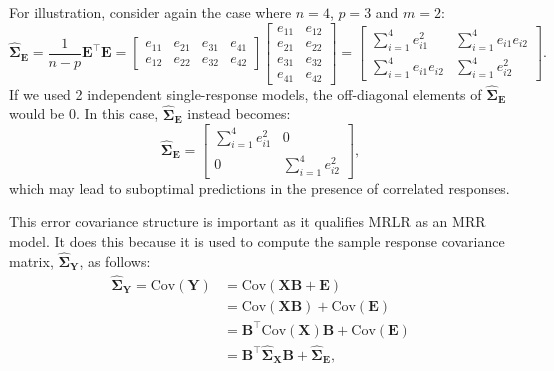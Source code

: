\documentclass[11pt]{report} %
\begin{document}
For illustration, consider again the case where $n=4$, $p=3$ and $m=2$:
\begin{equation}
    \mathbf{\hat{\Sigma}_E} = \frac{1}{n-p}\mathbf{E}^\top \mathbf{E}=
\begin{bmatrix}
e_{11} & e_{21} & e_{31} & e_{41} \\
e_{12} & e_{22} & e_{32} & e_{42}
\end{bmatrix}
\begin{bmatrix}
e_{11} & e_{12} \\
e_{21} & e_{22} \\
e_{31} & e_{32} \\
e_{41} & e_{42}
\end{bmatrix}=
\begin{bmatrix}
\sum_{i=1}^{4} e_{i1}^2 & \sum_{i=1}^{4} e_{i1} e_{i2} \\
\sum_{i=1}^{4} e_{i1} e_{i2} & \sum_{i=1}^{4} e_{i2}^2
\end{bmatrix}.
\label{off-diag}
\end{equation}
If we used 2 independent single-response models, the off-diagonal elements of \( \mathbf{\hat{\Sigma}_E} \) would be 0. In this case, $\mathbf{\hat{\Sigma}_E}$ instead becomes:
\begin{equation}
    \mathbf{\hat{\Sigma}_E} =
\begin{bmatrix}
\sum_{i=1}^{4} e_{i1}^2 & 0 \\
0 & \sum_{i=1}^{4} e_{i2}^2
\end{bmatrix},
\label{no off-diag}
\end{equation}
which may lead to suboptimal predictions in the presence of correlated responses.

This error covariance structure is important as it qualifies MRLR as an MRR model. It does this because it is used to compute the sample response covariance matrix, \( \mathbf{\hat{\Sigma}_Y} \), as follows:
\begin{equation}
    \begin{aligned}
        \mathbf{\hat{\Sigma}_Y} = \text{Cov}(\mathbf{Y})&= \text{Cov}(\mathbf{XB} + \mathbf{E}) \\
        &= \text{Cov}(\mathbf{XB}) + \text{Cov}(\mathbf{E}) \\
        &= \mathbf{B}^\top \text{Cov}(\mathbf{X}) \mathbf{B} + \text{Cov}(\mathbf{E}) \\
        &= \mathbf{B}^\top \mathbf{\hat{\Sigma}_X} \mathbf{B} + \mathbf{\hat{\Sigma}_E},
    \end{aligned}
    \label{MRLR = MRR}
\end{equation}
\end{document}
